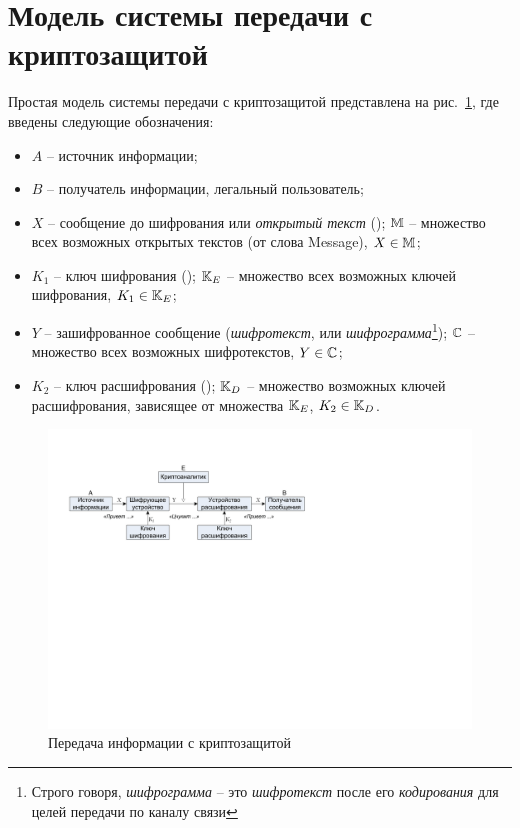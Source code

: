 \section{Модель системы передачи с криптозащитой}

Простая модель системы передачи с криптозащитой представлена на рис.~\ref{pic:Encrypt}, где введены следующие обозначения:
\begin{itemize}
    \item $A$ -- источник информации;
    \item $B$ -- получатель информации, легальный пользователь;
    \item $X$ -- сообщение до шифрования или \emph{открытый текст} (); $\mathbb{M}$ -- множество всех возможных открытых текстов (от слова Message), $X \in \mathbb{M}$;
    \item $K_1$ -- ключ шифрования (); $\mathbb{K}_E$ -- множество всех возможных ключей шифрования, $K_1 \in \mathbb{K}_E$;
    \item $Y$ -- зашифрованное сообщение (\emph{шифротекст},  или \emph{шифрограмма}\footnote{Строго говоря, \emph{шифрограмма} -- это \emph{шифротекст} после его \emph{кодирования} для целей передачи по каналу связи}); $\mathbb{C}$ -- множество всех возможных шифротекстов, $Y \in \mathbb{C}$;
    \item $K_2$ -- ключ расшифрования (); $\mathbb{K}_D$  -- множество возможных ключей расшифрования, зависящее от множества $\mathbb{K}_E$, $K_2 \in \mathbb{K}_D$.
\end{itemize}

\begin{figure}[!thb]
	\centering
	\includegraphics[width=1.0\textwidth]{pic/scheme-of-cipher}
	\caption{Передача информации с криптозащитой\label{pic:Encrypt}}
\end{figure}

